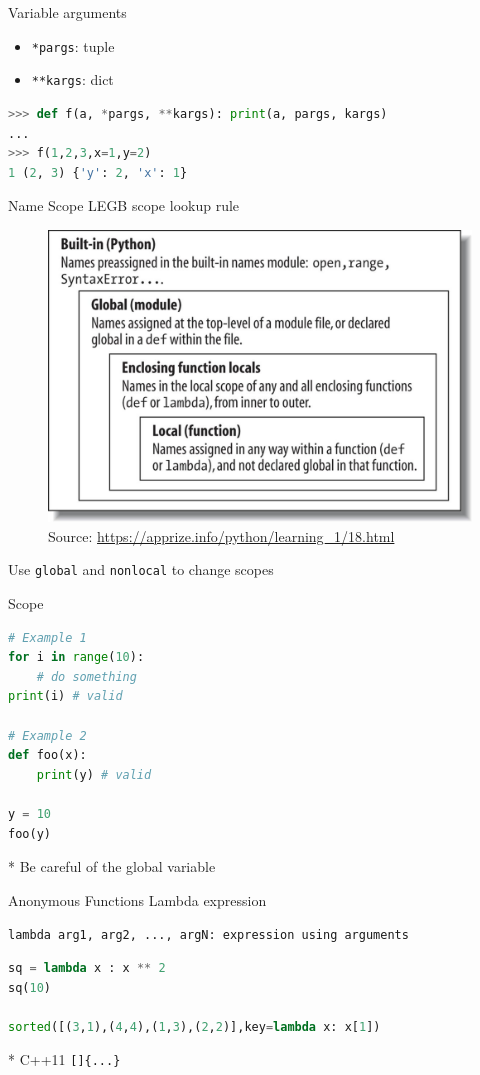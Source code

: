 \documentclass{../TexTemplate/myslide}
\begin{document}

\begin{frame}[fragile]{Variable arguments}
\begin{itemize}
	\item \verb'*pargs': tuple
	\item \verb'**kargs': dict
\end{itemize}
\begin{lstlisting}[language=python]
>>> def f(a, *pargs, **kargs): print(a, pargs, kargs)
...
>>> f(1,2,3,x=1,y=2)
1 (2, 3) {'y': 2, 'x': 1}
\end{lstlisting}
\end{frame}

\begin{frame}[fragile]{Name Scope}
LEGB scope lookup rule
\begin{figure}
\centering
\includegraphics[width=0.6\linewidth]{fig/legb.jpg}
\caption*{\scriptsize Source: \url{https://apprize.info/python/learning_1/18.html}}
\end{figure}
Use \verb'global' and \verb'nonlocal' to change scopes
\end{frame}

\begin{frame}[fragile]{Scope}
\begin{lstlisting}[language=python]
# Example 1
for i in range(10):
    # do something
print(i) # valid

# Example 2
def foo(x):
    print(y) # valid

y = 10
foo(y)
\end{lstlisting}
* Be careful of the global variable
\end{frame}

\begin{frame}[fragile]{Anonymous Functions}
Lambda expression
\begin{center}
\verb'lambda arg1, arg2, ..., argN: expression using arguments'
\end{center}
\begin{lstlisting}[language=python]
sq = lambda x : x ** 2
sq(10)

sorted([(3,1),(4,4),(1,3),(2,2)],key=lambda x: x[1])
\end{lstlisting}
* C++11 \verb'[]{...}'
\end{frame}
\end{document}
